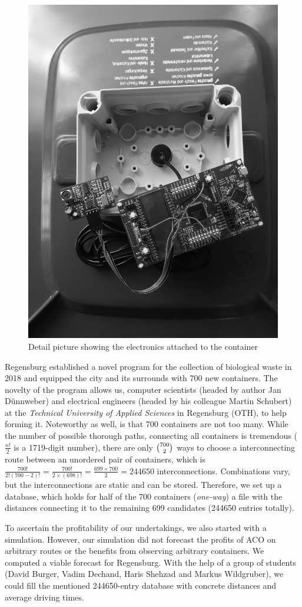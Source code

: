 \documentclass[10pt]{article}
\begin{document}
\begin{figure}[h!]
    \centering
  \includegraphics[trim={3cm 4cm 3cm 3cm}, clip,width=0.5\linewidth]{sensor}
  \caption{Detail picture showing the electronics attached to the container}
  \label{fig:electronics}       %
\end{figure}

Regensburg established a novel program for the collection of biological waste in 2018 
and equipped the city and its surrounds with 700 new containers. The novelty of the program
allows us, computer scientists (headed by author Jan D{\"u}nnweber) and electrical 
engineers (headed by his colleague Martin Schubert) at the {\it Technical 
University of Applied Sciences} in Regensburg (OTH), to help forming it.
Noteworthy as well, is that 700 containers are not too many. While the number
of possible thorough paths, connecting all containers is tremendous ($\frac{n!}{2}$ is a 
1719-digit number), there are only  $\tbinom {700}{2}$ ways to choose a interconnecting 
route between an unordered pair of containers, which is 
$\frac{700!}{2!(700 - 2)!}=\frac{700!}{2 \times (698)!}=\frac{699 \times 700}{2}=244650$ interconnections. Combinations vary, but the interconnections are static and can be stored.
Therefore, we set up a database, which holds for half of the 700 containers ({\it one-way})
a file with the distances connecting it to the remaining 699 candidates (244650 entries
totally).

To ascertain the profitability of our undertakings, we also started with a simulation.
However, our simulation did not forecast the profits of ACO on arbitrary routes or the
benefits from observing arbitrary containers. We computed a viable forecast for Regensburg.
With the help of a group of students (David Burger, Vadim Dechand, 
Haris Shehzad and Markus Wildgruber), we could fill the mentioned 
244650-entry database with concrete distances and average driving times. 
\end{document}
